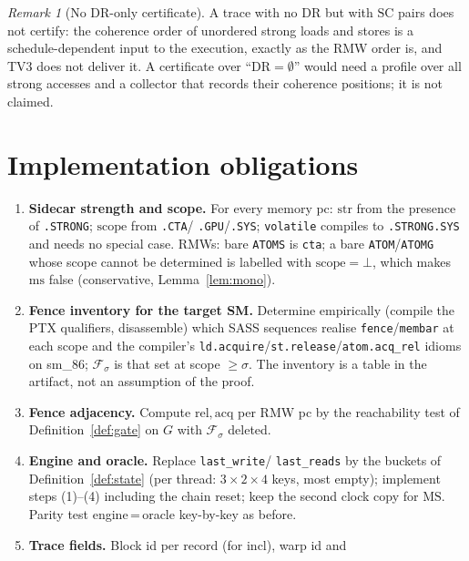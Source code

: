\documentclass[11pt]{article}
\theoremstyle{remark}
\newtheorem{remark}{Remark}
\newcommand{\str}{\mathrm{str}}
\newcommand{\scope}{\mathrm{scope}}
\newcommand{\rel}{\mathrm{rel}}
\newcommand{\acq}{\mathrm{acq}}
\newcommand{\incl}{\mathrm{incl}}
\newcommand{\ms}{\mathrm{ms}}
\newcommand{\DR}{\mathrm{DR}}
\newcommand{\SC}{\mathrm{SC}}
\newcommand{\MS}{\mathrm{MS}}
\newcommand{\Fences}{\mathcal{F}}
\begin{document}
\begin{remark}[No $\DR$-only certificate]
A trace with no $\DR$ but with $\SC$ pairs does not certify: the coherence
order of unordered strong loads and stores is a schedule-dependent input to
the execution, exactly as the RMW order is, and TV3 does not deliver it. A
certificate over ``$\DR=\emptyset$'' would need a profile over all strong
accesses and a collector that records their coherence positions; it is not
claimed.
\end{remark}

\section{Implementation obligations}\label{sec:obl}

\begin{enumerate}[label=O\arabic*.,nosep]
\item \textbf{Sidecar strength and scope.} For every memory pc: $\str$ from
      the presence of \texttt{.STRONG}; $\scope$ from \texttt{.CTA}/%
      \texttt{.GPU}/\texttt{.SYS}; \texttt{volatile} compiles to
      \texttt{.STRONG.SYS} and needs no special case. RMWs: bare
      \texttt{ATOMS} is \texttt{cta}; a bare \texttt{ATOM}/\texttt{ATOMG}
      whose scope cannot be determined is labelled with $\scope=\bot$, which
      makes $\ms$ false (conservative, Lemma~\ref{lem:mono}).
\item \textbf{Fence inventory for the target SM.} Determine empirically
      (compile the PTX qualifiers, disassemble) which SASS sequences realise
      \texttt{fence}/\texttt{membar} at each scope and the compiler's
      \texttt{ld.acquire}/\texttt{st.release}/\texttt{atom.acq\_rel} idioms
      on sm\_86; $\Fences_\sigma$ is that set at scope $\ge\sigma$. The
      inventory is a table in the artifact, not an assumption of the proof.
\item \textbf{Fence adjacency.} Compute $\rel,\acq$ per RMW pc by the
      reachability test of Definition~\ref{def:gate} on $G$ with
      $\Fences_\sigma$ deleted.
\item \textbf{Engine and oracle.} Replace \texttt{last\_write}/%
      \texttt{last\_reads} by the buckets of Definition~\ref{def:state}
      (per thread: $3\times2\times4$ keys, most empty); implement steps
      (1)--(4) including the chain reset; keep the second clock copy for
      $\MS$. Parity test engine\,=\,oracle key-by-key as before.
\item \textbf{Trace fields.} Block id per record (for $\incl$), warp id and

\end{enumerate}
\end{document}
